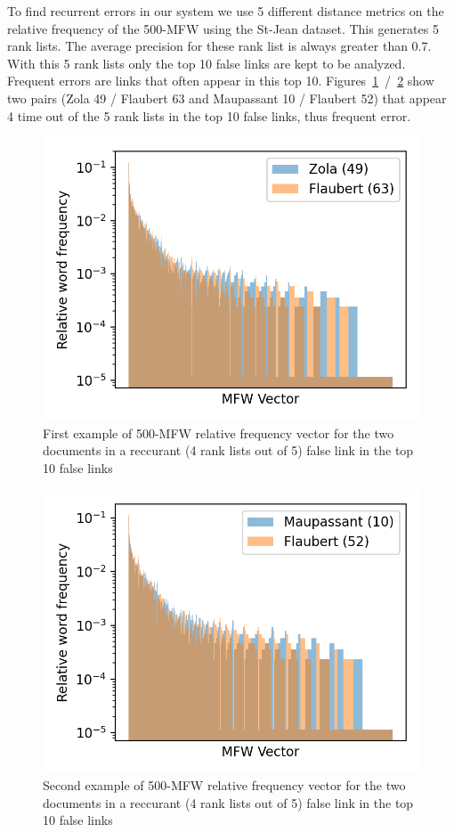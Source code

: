 To find recurrent errors in our system we use 5 different distance metrics on the relative frequency of the 500-MFW using the St-Jean dataset.
This generates 5 rank lists.
The average precision for these rank list is always greater than 0.7.
With this 5 rank lists only the top 10 false links are kept to be analyzed.
Frequent errors are links that often appear in this top 10.
Figures~\ref{fig:mfw_vector_error_0}~/~\ref{fig:mfw_vector_error_1} show two pairs (Zola 49 / Flaubert 63 and Maupassant 10 / Flaubert 52) that appear 4 time out of the 5 rank lists in the top 10 false links, thus frequent error.

\begin{figure}
  \includegraphics[width=\linewidth]{img/mfw_vector_error_0.png}
  \caption{First example of 500-MFW relative frequency vector for the two documents in a reccurant (4 rank lists out of 5) false link in the top 10 false links}
  \label{fig:mfw_vector_error_0}
\end{figure}
\begin{figure}
  \includegraphics[width=\linewidth]{img/mfw_vector_error_1.png}
  \caption{Second example of 500-MFW relative frequency vector for the two documents in a reccurant (4 rank lists out of 5) false link in the top 10 false links}
  \label{fig:mfw_vector_error_1}
\end{figure}

